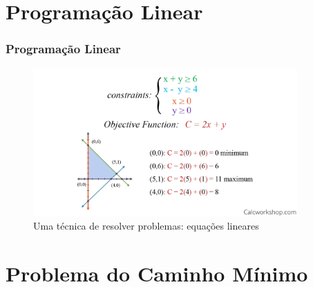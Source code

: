 \documentclass{beamer}
\begin{document}
\section{Programação Linear}
\begin{frame}
	\frametitle{Programação Linear}
	
	\begin{figure}[ht!]
		\centering
		\includegraphics[width=0.9\textwidth , height=0.78\textheight]{linear-programming-example.pdf}
    	\caption{Uma técnica de resolver problemas: equações lineares} 
	\end{figure}
	
\end{frame}


\section{Problema do Caminho Mínimo}
\end{document}
